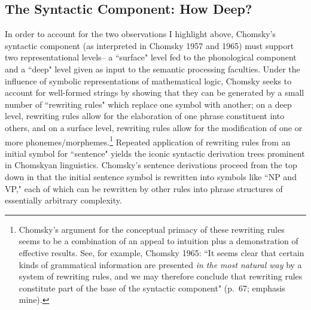 \subsection{The Syntactic Component: How Deep?}
In order to account for the two observations I highlight above, Chomsky's syntactic component (as interpreted in Chomsky 1957 and 1965) must support two representational levels-- a ``surface" level fed to the phonological component and a ``deep" level given as input to the semantic processing faculties.  Under the influence of symbolic representations of mathematical logic, Chomsky seeks to account for well-formed strings by showing that they can be generated by a small number of ``rewriting rules" which replace one symbol with another; on a deep level, rewriting rules allow for the elaboration of one phrase constituent into others, and on a surface level, rewriting rules allow for the modification of one or more phonemes/morphemes.\footnote{Chomsky's argument for the conceptual primacy of these rewriting rules seems to be a combination of an appeal to intuition plus a demonstration of effective results.  See, for example, Chomsky 1965: ``It seems clear that certain kinds of grammatical information are presented \emph{in the most natural way} by a system of rewriting rules, and we may therefore conclude that rewriting rules constitute part of the base of the syntactic component" (p.\ 67; emphasis mine).}  Repeated application of rewriting rules from an initial symbol for ``sentence" yields the iconic syntactic derivation trees prominent in Chomskyan linguistics.  Chomsky's sentence derivations proceed from the top down in that the initial sentence symbol is rewritten into symbols like ``NP and VP," each of which can be rewritten by other rules into phrase structures of essentially arbitrary complexity.

